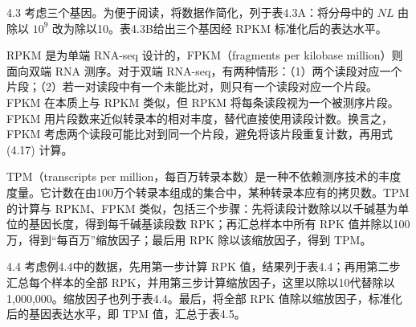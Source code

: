 \begin{bookexample}{4.3}
考虑三个基因。为便于阅读，将数据作简化，列于表4.3A：将分母中的 $NL$ 由除以 $10^9$ 改为除以10。表4.3B给出三个基因经 RPKM 标准化后的表达水平。


RPKM 是为单端 RNA-seq 设计的，FPKM（fragments per kilobase million）则面向双端 RNA 测序。对于双端 RNA-seq，有两种情形：（1）两个读段对应一个片段；（2）若一对读段中有一个未能比对，则只有一个读段对应一个片段。FPKM 在本质上与 RPKM 类似，但 RPKM 将每条读段视为一个被测序片段。FPKM 用片段数来近似转录本的相对丰度，替代直接使用读段计数。换言之，FPKM 考虑两个读段可能比对到同一个片段，避免将该片段重复计数，再用式 (4.17) 计算。

TPM（transcripts per million，每百万转录本数）是一种不依赖测序技术的丰度度量。它计数在由100万个转录本组成的集合中，某种转录本应有的拷贝数。TPM 的计算与 RPKM、FPKM 类似，包括三个步骤：先将读段计数除以以千碱基为单位的基因长度，得到每千碱基读段数 RPK；再汇总样本中所有 RPK 值并除以100万，得到“每百万”缩放因子；最后用 RPK 除以该缩放因子，得到 TPM。
\end{bookexample}

\begin{bookexample}{4.4}
考虑例4.4中的数据，先用第一步计算 RPK 值，结果列于表4.4；再用第二步汇总每个样本的全部 RPK，并用第三步计算缩放因子，这里以除以10代替除以1,000,000。缩放因子也列于表4.4。最后，将全部 RPK 值除以缩放因子，标准化后的基因表达水平，即 TPM 值，汇总于表4.5。


\end{bookexample}
\FloatBarrier
